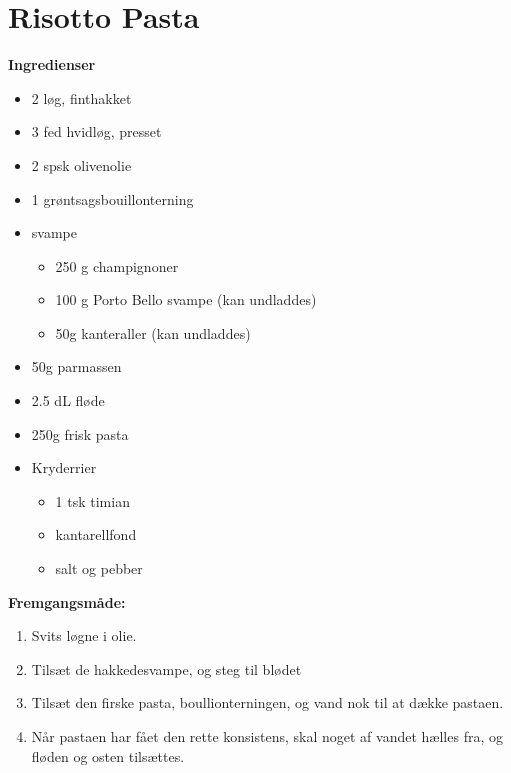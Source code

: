 \documentclass{book}
\begin{document}
\newpage \section{Risotto Pasta}
\begin{minipage}[t]{0.5\textwidth}
\textbf{Ingredienser}
\begin{itemize}
    \item 2 løg, finthakket
    \item 3 fed hvidløg, presset
    \item 2 spsk olivenolie
    \item 1 grøntsagsbouillonterning
    \item svampe
    \begin{itemize}
        \item 250 g champignoner 
        \item 100 g Porto Bello svampe (kan undladdes)
        \item 50g kanteraller (kan undladdes)
    \end{itemize}
    \item 50g parmassen
    \item 2.5 dL fløde
    \item 250g frisk pasta
    \item Kryderrier
    \begin{itemize}
        \item 1 tsk timian
        \item kantarellfond
        \item salt og pebber
    \end{itemize}
\end{itemize}
\end{minipage}
\begin{minipage}[t]{0.5\textwidth}
\textbf{Fremgangsmåde:}
\begin{enumerate}
    \item Svits løgne i olie.
    \item Tilsæt de hakkedesvampe, og steg til blødet
    \item Tilsæt den firske pasta, boullionterningen, og vand nok til at dække pastaen.
    \item Når pastaen har fået den rette konsistens, skal noget af vandet hælles fra, og fløden og osten tilsættes.
\end{enumerate}
\end{minipage}
\end{document}
